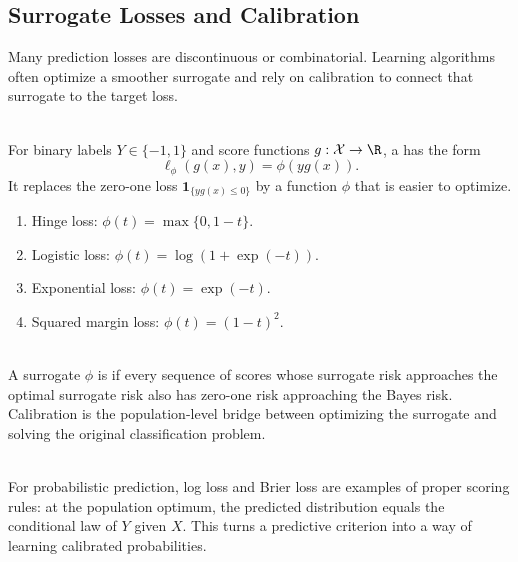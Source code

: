 \subsection{Surrogate Losses and Calibration}

Many prediction losses are discontinuous or combinatorial.  Learning algorithms often optimize a smoother surrogate and rely on calibration to connect that surrogate to the target loss.

\begin{definition} \label{def:sl-surrogate-loss} \\
For binary labels $Y\in\{-1,1\}$ and score functions $g:\mathcal{X}\to\R$, a  has the form
\[
\ell_{\phi}(g(x),y)=\phi(yg(x)).
\]
It replaces the zero-one loss $\mathbf{1}_{\{yg(x)\leq0\}}$ by a function $\phi$ that is easier to optimize.
\end{definition}

\begin{example} \label{ex:sl-margin-surrogates} 
\begin{enumerate}[label=(\roman*)]
\setlength{\itemsep}{0pt}
\item Hinge loss: $\phi(t)=\max\{0,1-t\}$.
\item Logistic loss: $\phi(t)=\log(1+\exp(-t))$.
\item Exponential loss: $\phi(t)=\exp(-t)$.
\item Squared margin loss: $\phi(t)=(1-t)^2$.
\end{enumerate}
\end{example}

\begin{definition} \label{def:sl-classification-calibration} \\
A surrogate $\phi$ is  if every sequence of scores whose surrogate risk approaches the optimal surrogate risk also has zero-one risk approaching the Bayes risk.  Calibration is the population-level bridge between optimizing the surrogate and solving the original classification problem.
\end{definition}

\begin{remark} \label{rem:sl-proper-scoring-rules} \\
For probabilistic prediction, log loss and Brier loss are examples of proper scoring rules: at the population optimum, the predicted distribution equals the conditional law of $Y$ given $X$.  This turns a predictive criterion into a way of learning calibrated probabilities.
\end{remark}
